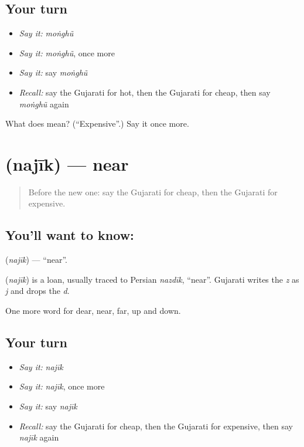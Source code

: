 \subsection*{Your turn}
\begin{itemize}
\raggedright
  \item \emph{Say it:} \emph{moṅghũ}
  \item \emph{Say it:} \emph{moṅghũ}, once more
  \item \emph{Say it:} say \emph{moṅghũ}
  \item \emph{Recall:} say the Gujarati for hot, then the Gujarati for cheap, then say \emph{moṅghũ} again
\end{itemize}

\begin{tcolorbox}[breakable,colback=teal!4,colframe=teal!35!black,title={Before you move on}]
What does  mean? (\textquotedblleft{}Expensive\textquotedblright{}.) Say it once more.
\end{tcolorbox}
\section[\texorpdfstring{\gu{નજીક} (najīk)}{નજીક (najīk)}]{ (najīk) — near}

\label{lesson:GU-C74-near}



\begin{quote}
Before the new one: say the Gujarati for cheap, then the Gujarati for expensive.
\end{quote}

\subsection*{You'll want to know: }
\textbf{} (\emph{najīk}) — \textquotedblleft{}near\textquotedblright{}.

\begin{cousinweb}
\textbf{} (\emph{najīk}) is a loan, usually traced to Persian \emph{nazdīk}, \textquotedblleft{}near\textquotedblright{}. Gujarati writes the \emph{z} as \emph{j} and drops the \emph{d}.
\end{cousinweb}

\begin{grammarlens}[title={What you've built}]
One more word for dear, near, far, up and down.
\end{grammarlens}

\subsection*{Your turn}
\begin{itemize}
\raggedright
  \item \emph{Say it:} \emph{najīk}
  \item \emph{Say it:} \emph{najīk}, once more
  \item \emph{Say it:} say \emph{najīk}
  \item \emph{Recall:} say the Gujarati for cheap, then the Gujarati for expensive, then say \emph{najīk} again
\end{itemize}

